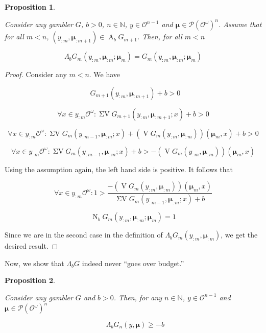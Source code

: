 \documentclass[aop,preprint]{imsart}
\numberwithin{equation}{section}
\theoremstyle{definition}
\theoremstyle{plain}
\newtheorem{proposition}{Proposition}[section]
\newcommand{\Nats}{\mathbb{N}}
\newcommand{\PM}{\mathcal{P}}
\newcommand{\Ob}{\mathcal{O}}
\newcommand{\OO}{\Ob^\omega}
\newcommand{\PMO}{\PM(\OO)}
\DeclareMathOperator{\V}{V}
\DeclareMathOperator{\SV}{\Sigma V}
\DeclareMathOperator{\SVM}{\Sigma V_{\min}}
\DeclareMathOperator{\Ab}{A}
\DeclareMathOperator{\Nr}{N}
\newcommand{\Bd}{\Lambda}
\newcommand{\BM}{\bm{\mu}}
\begin{document}
\begin{proposition}
\label{prp:b_no_effect}

Consider any gambler $G$, $b > 0$, $n \in \Nats$, $y \in \Ob^{n - 1}$ and $\BM \in \PMO^n$. Assume that for all $m < n$, $\left(y_{:m},\BM_{:m+1}\right) \in \Ab_b G_{m+1}$. Then, for all $m < n$

\begin{equation}
\Bd_b G_m\left(y_{:m},\BM_{:m};\BM_m\right)=G_m\left(y_{:m},\BM_{:m};\BM_m\right)
\end{equation}

\end{proposition}

\begin{proof}

Consider any $m < n$. We have

$$\SVM G_{m+1}\left(y_{:m},\BM_{:m+1}\right) + b > 0$$

$$\forall x \in y_{:m}\OO: \SV G_{m+1}\left(y_{:m},\BM_{:m+1}; x\right) + b > 0$$

$$\forall x \in y_{:m}\OO: \SV G_{m}\left(y_{:m-1},\BM_{:m}; x\right) + \left(\V G_{m}\left(y_{:m},\BM_{:m}\right)\right)\left(\BM_{m}, x\right) + b > 0$$

$$\forall x \in y_{:m}\OO: \SV G_{m}\left(y_{:m-1},\BM_{:m}; x\right) + b > -\left(\V G_{m}\left(y_{:m},\BM_{:m}\right)\right)\left(\BM_{m}, x\right)$$

Using the assumption again, the left hand side is positive. It follows that

$$\forall x \in y_{:m}\OO: 1 > \frac{-\left(\V G_{m}\left(y_{:m},\BM_{:m}\right)\right)\left(\BM_{m}, x\right)}{\SV G_{m}\left(y_{:m-1},\BM_{:m}; x\right) + b}$$

$$\Nr_b G_m\left(y_{:m},\BM_{:m};\BM_m\right) = 1$$

Since we are in the second case in the definition of ${\Bd_b G_m\left(y_{:m},\BM_{:m}\right)}$, we get the desired result.
\end{proof}

Now, we show that $\Bd_b G$ indeed never \enquote{goes over budget.}

\begin{proposition}
\label{prp:b_stays_in_budget}

Consider any gambler $G$ and $b > 0$. Then, for any $n \in \Nats$, $y \in \Ob^{n-1}$ and $\BM \in \PMO^n$

\begin{equation}
\SVM \Bd_b G_n\left(y,\BM\right) \geq -b
\end{equation} 

\end{proposition}
\end{document}

